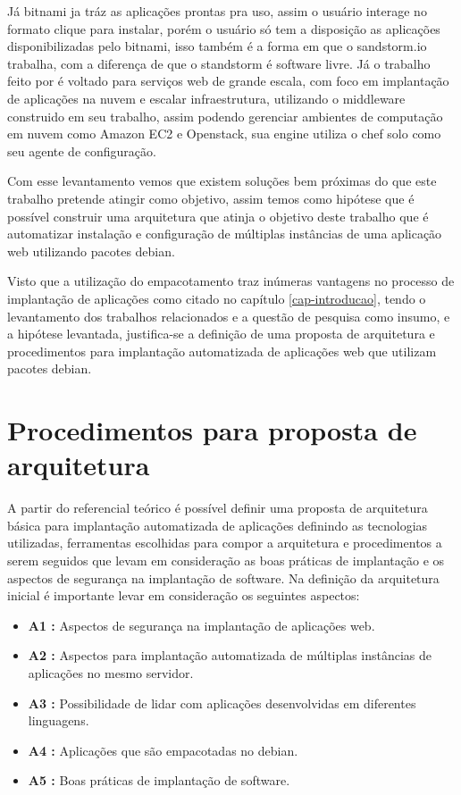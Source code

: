 Já bitnami ja tráz as aplicações
prontas pra uso, assim o usuário interage no formato clique para instalar, porém o usuário
só tem a disposição as aplicações disponibilizadas pelo bitnami, isso também é
a forma em que o sandstorm.io trabalha, com a diferença de que o standstorm é
software livre. Já o trabalho feito por \cite{leo2014} é voltado para serviços web
de grande escala, com foco em implantação de aplicações na nuvem e escalar infraestrutura, utilizando o middleware
construido em seu trabalho, assim podendo gerenciar ambientes de computação em nuvem
como Amazon EC2 e Openstack, sua engine utiliza o chef solo como seu agente de configuração.

Com esse levantamento vemos que existem soluções bem próximas do que este trabalho
pretende atingir como objetivo, assim temos como hipótese que é possível construir
uma arquitetura que atinja o objetivo deste trabalho que é automatizar instalação e configuração de
múltiplas instâncias de uma aplicação web utilizando pacotes debian.

Visto que a utilização do empacotamento traz inúmeras vantagens no processo de implantação
de aplicações como citado no capítulo \ref{cap-introducao}, tendo o levantamento dos trabalhos relacionados
e a questão de pesquisa como insumo, e a hipótese levantada, justifica-se a
definição de uma proposta de arquitetura e procedimentos para implantação automatizada
de aplicações web que utilizam pacotes debian.

\section{Procedimentos para proposta de arquitetura}

A partir do referencial teórico é possível definir uma proposta de
arquitetura básica para implantação automatizada de aplicações definindo as
tecnologias utilizadas, ferramentas escolhidas para compor a arquitetura e procedimentos
a serem seguidos que levam em consideração as boas práticas de implantação e os
aspectos de segurança na implantação de software. Na definição da arquitetura inicial
é importante levar em consideração os seguintes aspectos:

\begin{itemize}
  \item  \textbf{A1 :} Aspectos de segurança na implantação de aplicações web.
  \item  \textbf{A2 :} Aspectos para implantação automatizada de múltiplas instâncias de
   aplicações no mesmo servidor.
  \item  \textbf{A3 :} Possibilidade de lidar com aplicações desenvolvidas em
  diferentes linguagens.
  \item  \textbf{A4 :} Aplicações que são empacotadas no debian.
  \item  \textbf{A5 :} Boas práticas de implantação de software.
\end{itemize}

